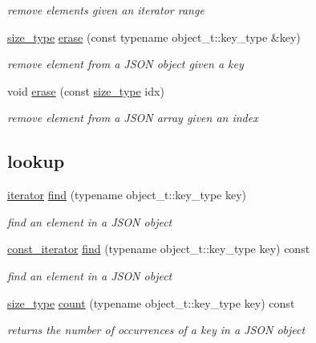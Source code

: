 \begin{DoxyCompactItemize}
\begin{DoxyCompactList}\small\item\em remove elements given an iterator range \end{DoxyCompactList}\item 
\hyperlink{a00025_a1579a8f72a230358d6cd1a6e8a62859b}{size\+\_\+type} \hyperlink{a00025_aa36e72ffc3241b960fe9186d19e03bc3}{erase} (const typename object\+\_\+t\+::key\+\_\+type \&key)
\begin{DoxyCompactList}\small\item\em remove element from a J\+S\+ON object given a key \end{DoxyCompactList}\item 
void \hyperlink{a00025_a3da254c422ede5495f2815c5e48c00c5}{erase} (const \hyperlink{a00025_a1579a8f72a230358d6cd1a6e8a62859b}{size\+\_\+type} idx)
\begin{DoxyCompactList}\small\item\em remove element from a J\+S\+ON array given an index \end{DoxyCompactList}\end{DoxyCompactItemize}
\subsection*{lookup}
\begin{DoxyCompactItemize}
\item 
\hyperlink{a00079}{iterator} \hyperlink{a00025_affe7e160e7bb06eed83c8b437af4692f}{find} (typename object\+\_\+t\+::key\+\_\+type key)
\begin{DoxyCompactList}\small\item\em find an element in a J\+S\+ON object \end{DoxyCompactList}\item 
\hyperlink{a00038}{const\+\_\+iterator} \hyperlink{a00025_aaa687595d7627925fbf6d6eb97e2021e}{find} (typename object\+\_\+t\+::key\+\_\+type key) const 
\begin{DoxyCompactList}\small\item\em find an element in a J\+S\+ON object \end{DoxyCompactList}\item 
\hyperlink{a00025_a1579a8f72a230358d6cd1a6e8a62859b}{size\+\_\+type} \hyperlink{a00025_a51b0036310d8aa5858fecc0d91127f27}{count} (typename object\+\_\+t\+::key\+\_\+type key) const 
\begin{DoxyCompactList}\small\item\em returns the number of occurrences of a key in a J\+S\+ON object \end{DoxyCompactList}\end{DoxyCompactItemize}
